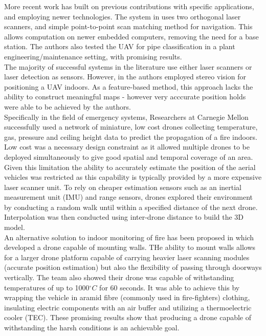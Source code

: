 \documentclass[capstone_report.tex]{subfiles}
\begin{document}
More recent work has built on previous contributions with specific applications, and employing newer technologies. The system in \cite{kumar} uses two orthogonal laser scanners, and simple point-to-point scan matching method for navigation. This allows computation on newer embedded computers, removing the need for a base station. The authors also tested the UAV for pipe classification in a plant engineering/maintenance setting, with promising results.\\

The majority of successful systems in the literature use either laser scanners or laser detection as sensors. However, in \cite{mustafah} the authors employed stereo vision for positioning a UAV indoors. As a feature-based method, this approach lacks the ability to construct meaningful maps - however very acccurate position holds were able to be achieved by the authors.\\

Specifically in the field of emergency systems, Researchers at Carnegie Mellon \cite{sensorfly} successfully used a network of miniature, low cost drones collecting temperature, gas, pressure and ceiling height data to predict the propagation of a fire indoors. Low cost was a necessary design constraint as it allowed multiple drones to be deployed simultaneously to give good spatial and temporal coverage of an area. Given this limitation the ability to accurately estimate the position of the aerial vehicles was restricted as this capability is typically provided by a more expensive laser scanner unit. To rely on cheaper estimation sensors such as an inertial measurement unit (IMU) and range sensors, drones explored their environment by conducting a random walk until within a specified distance of the next drone. Interpolation was then conducted using inter-drone distance to build the 3D model.\\

An alternative solution to indoor monitoring of fire has been proposed in \cite{myeong} which developed a drone capable of mounting walls.  THe ability to mount walls allows for a larger drone platform capable of carrying heavier laser scanning modules (accurate position estimation) but also the flexibility of passing through doorways vertically.  The team also showed their drone was capable of withstanding temperatures of up to 1000$^\circ C$ for 60 seconds.  It was able to achieve this by wrapping the vehicle in aramid fibre (commonly used in fire-fighters) clothing, insulating electric components with an air buffer and utilizing a thermoelectric cooler (TEC).  These promising results show that producing a drone capable of withstanding the harsh conditions is an achievable goal.\\
\end{document}
